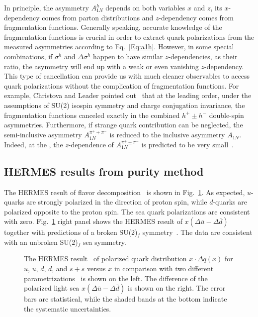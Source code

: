 In principle, the asymmetry $A_{1N}^h$ depends on both
variables $x$ and $z$, its $x$-dependency comes from parton distributions and
$z$-dependency comes from fragmentation functions. 
Generally speaking, accurate knowledge of
the fragmentation functions is crucial in order to extract quark polarizations from the measured
asymmetries according to Eq.~\ref{Eq:a1h}.  However, in some special combinations, if $\sigma^h$ and
$\Delta \sigma^h$ happen to have similar $z$-dependencies, as their ratio, the asymmetry  
will end up with a weak or even vanishing $z$-dependency. This type of cancellation can provide
 us with much cleaner
 observables to access quark polarizations without the complication of fragmentation functions. 
For example,     
Christova and Leader pointed out~\cite{leader2} that at the leading order, 
under the assumptions of SU(2) isospin symmetry and charge conjugation invariance, 
the fragmentation functions 
canceled exactly in the combined $h^+ \pm h^-$ double-spin
asymmetries. Furthermore, if strange quark contribution can be neglected, 
the semi-inclusive asymmetry $A_{1N}^{\pi^+ + \pi^-}$ is reduced
to the inclusive asymmetry $A_{1N}$.  
Indeed, at the \nloo, the 
$z$-dependence of $A_{1N}^{\pi^+ \pm \pi^-}$
is predicted to be very small~\cite{sassotnlo}.

\subsection{HERMES results from \lo purity method }
The HERMES result of flavor decomposition~\cite{hermes2002} is shown 
in Fig.~\ref{fig:polxq}. 
As expected, $u$-quarks are strongly polarized in the direction of 
proton spin, while $d$-quarks are polarized 
opposite to the proton spin.  The sea quark polarizations are consistent with zero. 
Fig.~\ref{fig:polxq} right panel shows the HERMES result of $x(\Delta\bar{u} -
\Delta\bar{d})$ together with predictions of a broken SU(2)$_f$
symmetry~\cite{lit:goeke,cao}.  The data are
consistent with an unbroken SU(2)$_f$ sea symmetry.   
\begin{figure}[htb]
\centerline{
}
\caption{\label{fig:polxq} The HERMES result~\protect\cite{hermes2002} of 
polarized quark distribution  $x \cdot \Delta q(x)$ for
$u$, $\bar{u}$, $d$, $\bar{d}$, and $s+\bar{s}$  versus $x$  in comparison 
with two different parametrizations~\protect\cite{lit:grsv2000,lit:bbfit} is shown on the left.
The difference of the polarized light sea 
$x(\Delta \bar{u} - \Delta \bar{d})$ is shown on the right.
The error bars are statistical, while the shaded bands at the bottom indicate the systematic
uncertainties.
}
\end{figure}


